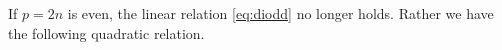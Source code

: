 \documentclass{amsart}
\theoremstyle{definition}
\DeclareMathOperator{\sgn}{\operatorname{sgn}}
\begin{document}
If $p=2n$ is even, the linear relation \eqref{eq:diodd} no longer
holds. Rather we have the following quadratic relation.
\end{document}
